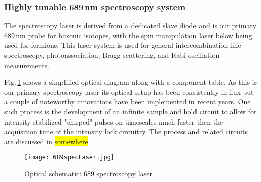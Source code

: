 \subsubsection{Highly tunable 689\,nm spectroscopy system}
The spectroscopy laser is derived from a dedicated slave diode and is our primary 689\,nm probe for bosonic isotopes, with the spin manipulation laser below being used for fermions.
This laser system is used for general intercombination line spectroscopy, photoassociation, Bragg scattering, and Rabi oscillation measurements.

Fig.\,\ref{fig:689specSch} shows a simplified optical diagram along with a component table.
As this is our primary spectroscopy laser its optical setup has been consistently in flux but a couple of noteworthy innovations have been implemented in recent years.
One such process is the development of an infinite sample and hold circuit to allow for intensity stabilized "chirped" pulses on timescales much faster then the acquisition time of the intensity lock circuitry.
The process and related circuits are discussed in \hl{somewhere}.
	\begin{figure}
	\centerline{
		\texttt{[image: 689specLaser.jpg]}}
		\caption{Optical schematic: 689 spectroscopy laser}
		 \label{fig:689specSch}
	\end{figure}

